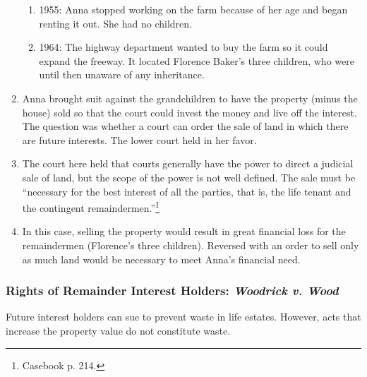 \begin{enumerate}
\begin{enumerate}
        \item 1955: Anna stopped working on the farm because of her age and 
        began renting it out. She had no children.
        \item 1964: The highway department wanted to buy the farm so it could 
        expand the freeway. It located Florence Baker's three children, who 
        were until then unaware of any inheritance.
    \end{enumerate}
    \item Anna brought suit against the grandchildren to have the property 
    (minus the house) sold so that the court could invest the money and live 
    off the interest. The question was whether a court can order the sale of 
    land in which there are future interests. The lower court held in her 
    favor.
    \item The court here held that courts generally have the power to direct a 
    judicial sale of land, but the scope of the power is not well defined. The 
    sale must be ``necessary for the best interest of all the parties, that 
    is, the life tenant and the contingent remaindermen.''\footnote{Casebook 
    p. 214.}
    \item In this case, selling the property would result in great financial 
    loss for the remaindermen (Florence's three children). Reversed with an 
    order to sell only as much land would be necessary to meet Anna's 
    financial need.
\end{enumerate}

\subsubsection{Rights of Remainder Interest Holders: \emph{Woodrick v. Wood}}

Future interest holders can sue to prevent waste in life estates. However, 
acts that increase the property value do not constitute waste.

